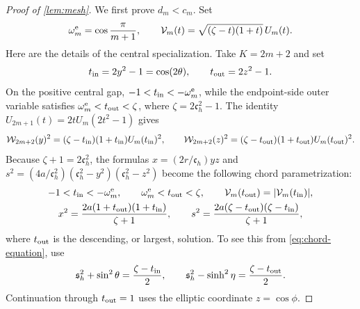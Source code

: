 \documentclass[review,hidelinks,onefignum,onetabnum]{siamart251216}
\begin{document}
\begin{proof}[Proof of \cref{lem:mesh}]
We first prove \(d_m<c_m\).  Set
\[
 \omega_m^{\rm e}=\cos\frac{\pi}{m+1},\qquad
 \mathcal V_m(t)=\sqrt{(\zeta-t)(1+t)}\,U_m(t).
\]
Here are the details of the central specialization.  Take \(K=2m+2\)
and set
\[
 t_{\rm in}=2y^2-1=\cos(2\theta),\qquad
 t_{\rm out}=2z^2-1.
\]
On the positive central gap,
\(-1<t_{\rm in}<-\omega_m^{\rm e}\), while the endpoint-side outer variable
satisfies
\(\omega_m^{\rm e}<t_{\rm out}<\zeta\), where
\(\zeta=2\mathfrak c_h^2-1\).  The identity
\(U_{2m+1}(t)=2tU_m(2t^2-1)\) gives
\[
 \mathcal W_{2m+2}(y)^2
  = (\zeta-t_{\rm in})(1+t_{\rm in})U_m(t_{\rm in})^2,
 \qquad
 \mathcal W_{2m+2}(z)^2
  = (\zeta-t_{\rm out})(1+t_{\rm out})U_m(t_{\rm out})^2.
\]
Because \(\zeta+1=2\mathfrak c_h^2\), the formulas
\(x=(2r/\mathfrak c_h)yz\) and
\(s^2=(4a/\mathfrak c_h^2)
(\mathfrak c_h^2-y^2)(\mathfrak c_h^2-z^2)\) become the following chord
parametrization:
\begin{equation}\label{eq:central-chord}
\begin{gathered}
 -1<t_{\rm in}<-\omega_m^{\rm e},\qquad
 \omega_m^{\rm e}<t_{\rm out}<\zeta,\qquad
 \mathcal V_m(t_{\rm out})=|\mathcal V_m(t_{\rm in})|,\\
 x^2=\frac{2a(1+t_{\rm out})(1+t_{\rm in})}{\zeta+1},\qquad
 s^2=\frac{2a(\zeta-t_{\rm out})(\zeta-t_{\rm in})}{\zeta+1},
\end{gathered}
\end{equation}
where \(t_{\rm out}\) is the descending, or largest, solution.  To see this
from \eqref{eq:chord-equation}, use
\[
 \mathfrak s_h^2+\sin^2\theta=\frac{\zeta-t_{\rm in}}{2},\qquad
 \mathfrak s_h^2-\sinh^2\eta=\frac{\zeta-t_{\rm out}}{2}.
\]
Continuation through \(t_{\rm out}=1\) uses the elliptic coordinate
\(z=\cos\phi\).


\end{proof}
\end{document}
